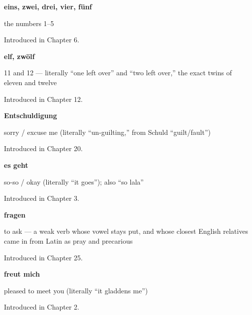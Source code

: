 \noindent\begin{minipage}[t]{\linewidth}
\raggedright
\textbf{eins, zwei, drei, vier, fünf}\par
\small the numbers 1–5\par
\footnotesize Introduced in Chapter 6.
\end{minipage}\par\medskip

\noindent\begin{minipage}[t]{\linewidth}
\raggedright
\textbf{elf, zwölf}\par
\small 11 and 12 — literally \textquotedblleft{}one left over\textquotedblright{} and \textquotedblleft{}two left over,\textquotedblright{} the exact twins of eleven and twelve\par
\footnotesize Introduced in Chapter 12.
\end{minipage}\par\medskip

\noindent\begin{minipage}[t]{\linewidth}
\raggedright
\textbf{Entschuldigung}\par
\small sorry / excuse me (literally \textquotedblleft{}un-guilting,\textquotedblright{} from Schuld \textquotedblleft{}guilt/fault\textquotedblright{})\par
\footnotesize Introduced in Chapter 20.
\end{minipage}\par\medskip

\noindent\begin{minipage}[t]{\linewidth}
\raggedright
\textbf{es geht}\par
\small so-so / okay (literally \textquotedblleft{}it goes\textquotedblright{}); also \textquotedblleft{}so lala\textquotedblright{}\par
\footnotesize Introduced in Chapter 3.
\end{minipage}\par\medskip

\noindent\begin{minipage}[t]{\linewidth}
\raggedright
\textbf{fragen}\par
\small to ask — a weak verb whose vowel stays put, and whose closest English relatives came in from Latin as pray and precarious\par
\footnotesize Introduced in Chapter 25.
\end{minipage}\par\medskip

\noindent\begin{minipage}[t]{\linewidth}
\raggedright
\textbf{freut mich}\par
\small pleased to meet you (literally \textquotedblleft{}it gladdens me\textquotedblright{})\par
\footnotesize Introduced in Chapter 2.
\end{minipage}\par\medskip


